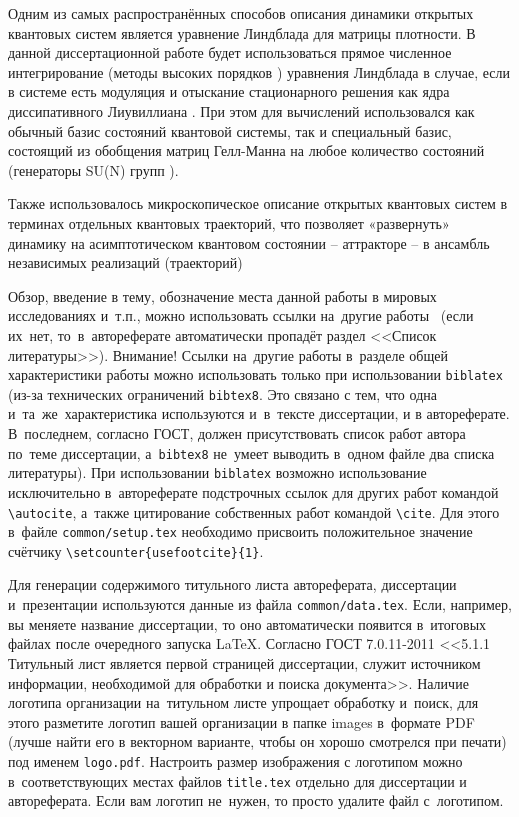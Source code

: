 {\methods} 
Одним из самых распространённых способов описания динамики открытых квантовых систем является уравнение Линдблада \autocite{Lindblad1976, Gorini1976, book2007} для матрицы плотности.
В данной диссертационной работе будет использоваться прямое численное интегрирование (методы высоких порядков \autocite{Lambert1991}) уравнения Линдблада в случае, если в системе есть модуляция и отыскание стационарного решения как ядра диссипативного Лиувиллиана \autocite{Hartmann2017, Nation2015}. При этом для вычислений использовался как обычный базис состояний квантовой системы, так и специальный базис, состоящий из обобщения матриц Гелл-Манна \autocite{GellMann1962} на любое количество состояний \autocite{Lendi1987} (генераторы SU(N) групп \autocite{Georgi2018}).

Также использовалось микроскопическое описание открытых квантовых систем в терминах отдельных квантовых траекторий, что позволяет «развернуть» динамику на асимптотическом квантовом состоянии – аттракторе – в ансамбль независимых реализаций (траекторий) \autocite{Dalibard1992, Dum1992, Plenio1998, Volokitin2017}






Обзор, введение в тему, обозначение места данной работы в
мировых исследованиях и~т.\:п., можно использовать ссылки на~другие
работы~\autocite{Gosele1999161,Lermontov}
(если их~нет, то~в~автореферате
автоматически пропадёт раздел <<Список литературы>>). Внимание! Ссылки
на~другие работы в~разделе общей характеристики работы можно
использовать только при использовании \verb!biblatex! (из-за технических
ограничений \verb!bibtex8!. Это связано с тем, что одна
и~та~же~характеристика используются и~в~тексте диссертации, и в
автореферате. В~последнем, согласно ГОСТ, должен присутствовать список
работ автора по~теме диссертации, а~\verb!bibtex8! не~умеет выводить в~одном
файле два списка литературы).
При использовании \verb!biblatex! возможно использование исключительно
в~автореферате подстрочных ссылок
для других работ командой \verb!\autocite!, а~также цитирование
собственных работ командой \verb!\cite!. Для этого в~файле
\verb!common/setup.tex! необходимо присвоить положительное значение
счётчику \verb!\setcounter{usefootcite}{1}!.

Для генерации содержимого титульного листа автореферата, диссертации
и~презентации используются данные из файла \verb!common/data.tex!. Если,
например, вы меняете название диссертации, то оно автоматически
появится в~итоговых файлах после очередного запуска \LaTeX. Согласно
ГОСТ 7.0.11-2011 <<5.1.1 Титульный лист является первой страницей
диссертации, служит источником информации, необходимой для обработки и
поиска документа>>. Наличие логотипа организации на~титульном листе
упрощает обработку и~поиск, для этого разметите логотип вашей
организации в папке images в~формате PDF (лучше найти его в векторном
варианте, чтобы он хорошо смотрелся при печати) под именем
\verb!logo.pdf!. Настроить размер изображения с логотипом можно
в~соответствующих местах файлов \verb!title.tex!  отдельно для
диссертации и автореферата. Если вам логотип не~нужен, то просто
удалите файл с~логотипом.

